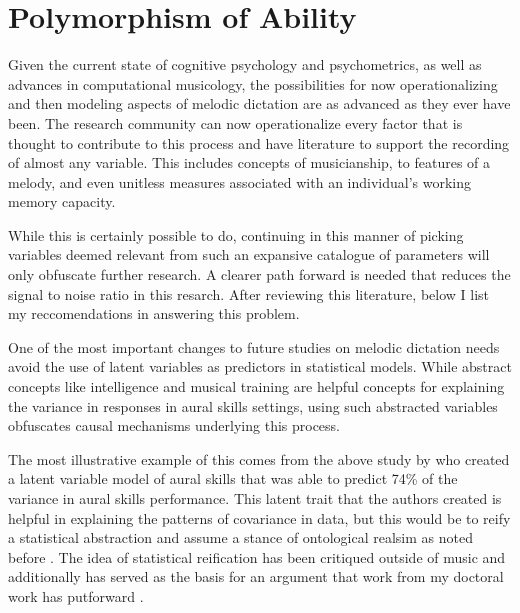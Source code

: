 \documentclass[]{book}
\begin{document}
\hypertarget{polymorphism-of-ability}{%
\section{Polymorphism of Ability}\label{polymorphism-of-ability}}

Given the current state of cognitive psychology and psychometrics, as well as advances in computational musicology, the possibilities for now operationalizing and then modeling aspects of melodic dictation are as advanced as they ever have been.
The research community can now operationalize every factor that is thought to contribute to this process and have literature to support the recording of almost any variable.
This includes concepts of musicianship, to features of a melody, and even unitless measures associated with an individual's working memory capacity.

While this is certainly possible to do, continuing in this manner of picking variables deemed relevant from such an expansive catalogue of parameters will only obfuscate further research.
A clearer path forward is needed that reduces the signal to noise ratio in this resarch.
After reviewing this literature, below I list my reccomendations in answering this problem.

One of the most important changes to future studies on melodic dictation needs avoid the use of latent variables as predictors in statistical models.
While abstract concepts like intelligence and musical training are helpful concepts for explaining the variance in responses in aural skills settings, using such abstracted variables obfuscates causal mechanisms underlying this process.

The most illustrative example of this comes from the above study by \citet{harrisonEffectsMusicalAptitude1994} who created a latent variable model of aural skills that was able to predict 74\% of the variance in aural skills performance.
This latent trait that the authors created is helpful in explaining the patterns of covariance in data, but this would be to reify a statistical abstraction and assume a stance of ontological realsim as noted before \citep{borsboomTheoreticalStatusLatent2003}.
The idea of statistical reification has been critiqued outside of music \citep{gouldMismeasureMan1996, kovacsProcessOverlapTheory2016} and additionally has served as the basis for an argument that work from my doctoral work has putforward \citep{bakerExaminingMusicalSophistication2018a}.
\end{document}
